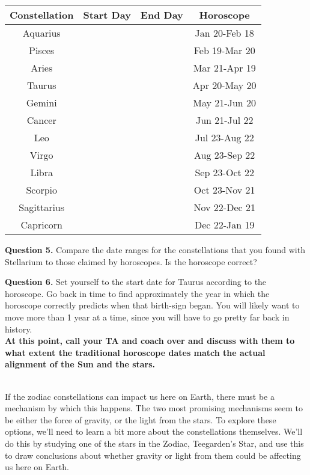 \documentclass[11pt]{article}
\begin{document}
\begin{center}
	\begin{tabular}{|c|c|c|c|}
		\hline
		Constellation&Start Day&End Day&Horoscope\\ \hline
		Aquarius    & & &Jan 20-Feb 18\\ \hline
		Pisces      & & &Feb 19-Mar 20\\ \hline
		Aries       & & &Mar 21-Apr 19\\ \hline
		Taurus      & & &Apr 20-May 20\\ \hline
		Gemini      & & &May 21-Jun 20\\ \hline
		Cancer      & & &Jun 21-Jul 22\\ \hline
		Leo         & & &Jul 23-Aug 22\\ \hline	
		Virgo       & & &Aug 23-Sep 22\\ \hline
		Libra       & & &Sep 23-Oct 22\\ \hline
		Scorpio     & & &Oct 23-Nov 21\\ \hline
		Sagittarius & & &Nov 22-Dec 21\\ \hline
		Capricorn   & & &Dec 22-Jan 19\\
		\hline
	\end{tabular}
\end{center}

\textbf{Question 5.} Compare the date ranges for the constellations that you found with Stellarium to those claimed by horoscopes. Is the horoscope correct?\\

\vspace{1.5cm}

\textbf{Question 6.} Set yourself to the start date for Taurus according to the horoscope. Go back in time to find approximately the year in which the horoscope correctly predicts when that birth-sign began. You will likely want to move more than 1 year at a time, since you will have to go pretty far back in history.\\


\bf At this point, call your TA and coach over and discuss with them to what extent the traditional horoscope dates match the actual alignment of the Sun and the stars.
\rm



\vspace{1.5cm}
\hrulefill\\

If the zodiac constellations can impact us here on Earth, there must be a mechanism by which this happens. The two most promising mechanisms seem to be either the force of gravity, or the light from the stars. To explore these options, we'll need to learn a bit more about the constellations themselves. We'll do this by studying one of the stars in the Zodiac, Teegarden's Star, and use this to draw conclusions about whether gravity or light from them could be affecting us here on Earth.\\
\end{document}
